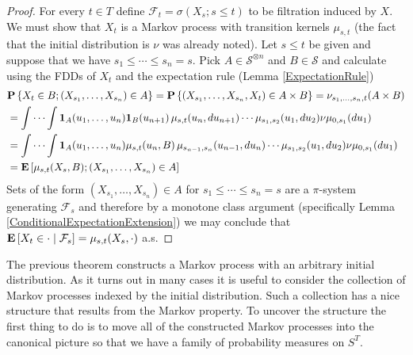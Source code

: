 \begin{proof}
For every $t \in T$ define $\mathcal{F}_t = \sigma(X_s ; s \leq t)$ to
be filtration induced by $X$.  We must show that $X_t$ is a Markov process with transition
kernels $\mu_{s,t}$ (the fact that the initial distribution is $\nu$
was already noted).  Let $s \leq t$ be given and suppose that we have
$s_1 \leq \dotsb \leq s_n = s$.  Pick $A \in \mathcal{S}^{\otimes n}$
and $B \in \mathcal{S}$ and calculate using the FDDs of $X_t$ and the
expectation rule (Lemma \ref{ExpectationRule})
\begin{align*}
&\probability{ X_t \in B ; (X_{s_1}, \dotsc, X_{s_n}) \in A}  = \probability{(X_{s_1}, \dotsc, X_{s_n}, X_t) \in A \times B} =
\nu_{s_1, \dotsc, s_n, t}(A \times B) \\
&=\idotsint \characteristic{A}(u_1, \dotsc, u_n) \characteristic{B}(u_{n+1})\, 
\mu_{s,t}(u_{n}, du_{n+1})  \dotsb \mu_{s_1, s_2}(u_1, du_2)  \nu \mu_{0,s_1}(du_1) \\
&=\idotsint \characteristic{A}(u_1,\dotsc, u_n) \mu_{s,t}(u_{n}, B)\, 
\mu_{s_{n-1},s_n}(u_{n-1}, du_{n}) \dotsb \mu_{s_1, s_2}(u_1, du_2) \nu \mu_{0,s_1}(du_1) \\
&=\expectation{ \mu_{s,t}(X_s, B) ; (X_{s_1}, \dotsc, X_{s_n}) \in A }
\end{align*}
Sets of the form $(X_{s_1}, \dotsc, X_{s_n}) \in A$ for $s_1 \leq
\dotsb \leq s_n=s$ are a $\pi$-system generating $\mathcal{F}_s$ and
therefore by a monotone class argument (specifically Lemma \ref{ConditionalExpectationExtension}) we may
conclude that $\cexpectationlong{\mathcal{F}_s}{X_t \in \cdot} =
\mu_{s,t}(X_s, \cdot)$ a.s.
\end{proof}

The previous theorem constructs a Markov process with an arbitrary initial distribution.  As it turns out in many cases
it is useful to consider the collection of Markov processes indexed by the initial distribution.  Such a collection has a
nice structure that results from the Markov property.  To uncover the structure the first thing to do is to move all of the 
constructed Markov processes into the canonical picture so that we have a family of probability measures on $S^T$.

